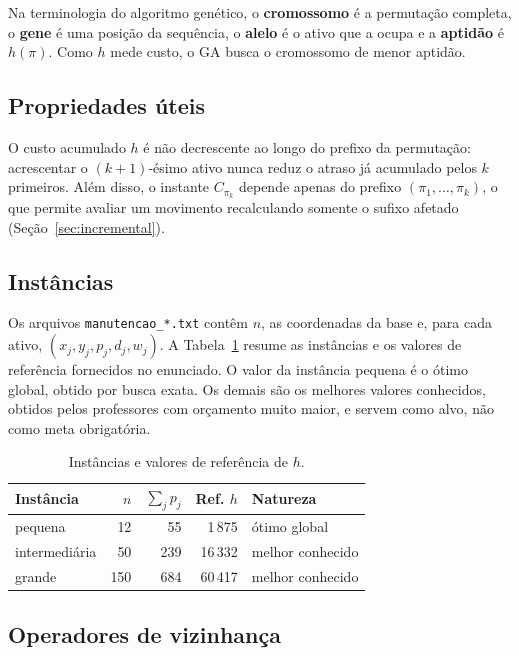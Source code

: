 Na terminologia do algoritmo genético, o \textbf{cromossomo} é a permutação completa, o \textbf{gene} é uma posição da sequência, o \textbf{alelo} é o ativo que a ocupa e a \textbf{aptidão} é $h(\pi)$. Como $h$ mede custo, o GA busca o cromossomo de menor aptidão.

\subsection{Propriedades úteis}

O custo acumulado $h$ é não decrescente ao longo do prefixo da permutação: acrescentar o $(k{+}1)$-ésimo ativo nunca reduz o atraso já acumulado pelos $k$ primeiros. Além disso, o instante $C_{\pi_k}$ depende apenas do prefixo $(\pi_1,\dots,\pi_k)$, o que permite avaliar um movimento recalculando somente o sufixo afetado (Seção~\ref{sec:incremental}).

\subsection{Instâncias}

Os arquivos \texttt{manutencao\_*.txt} contêm $n$, as coordenadas da base e, para cada ativo, $(x_j,y_j,p_j,d_j,w_j)$. A Tabela~\ref{tab:instancias} resume as instâncias e os valores de referência fornecidos no enunciado. O valor da instância pequena é o ótimo global, obtido por busca exata. Os demais são os melhores valores conhecidos, obtidos pelos professores com orçamento muito maior, e servem como alvo, não como meta obrigatória.

\begin{table}[H]
\centering
\caption{Instâncias e valores de referência de $h$.}
\label{tab:instancias}
\small
\begin{tabular}{lrrrl}
\toprule
Instância & $n$ & $\sum_j p_j$ & Ref. $h$ & Natureza\\
\midrule
pequena & 12 & 55 & 1\,875 & ótimo global\\
intermediária & 50 & 239 & 16\,332 & melhor conhecido\\
grande & 150 & 684 & 60\,417 & melhor conhecido\\
\bottomrule
\end{tabular}
\end{table}

\subsection{Operadores de vizinhança}\label{sec:vizinhancas}

